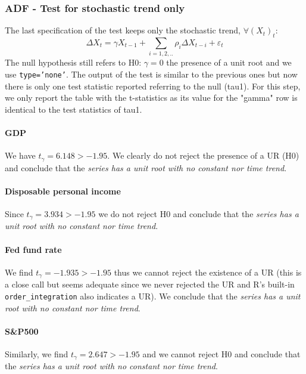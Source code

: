 \documentclass[hidelinks,12pts]{article}
\DeclareMathOperator{\1}{\mathbbm{1}}
\begin{document}
\subsubsection{ADF - Test for stochastic trend only}
The last specification of the test keeps only the stochastic trend, $\forall (X_t)_t$: 
    \begin{equation}
        \Delta X_t = \gamma X_{t-1} +\sum_{i=1,2,..}\rho_i \Delta X_{t-i} + \varepsilon_t
    \end{equation}
The null hypothesis still refers to H0: $\gamma =0$ the presence of a unit root and we use \texttt{type='none'}.
The output of the test is similar to the previous ones but now there is only one test statistic reported referring to the null (tau1).
For this step, we only report the table with the t-statistics as its value for the "gamma" row is identical to the test statistics of tau1.

%


\paragraph{GDP}
We have $t_\gamma = 6.148> -1.95$. We clearly do not reject the presence of a UR (H0) and conclude that the \emph{series has a unit root with no constant nor time trend}.

\paragraph{Disposable personal income}
Since $t_\gamma = 3.934> -1.95$ we do not reject H0 and conclude that the \emph{series has a unit root with no constant nor time trend}.

\paragraph{Fed fund rate}
We find $t_\gamma = -1.935> -1.95$ thus we cannot reject the existence of a UR (this is a close call but seems adequate since we never rejected the UR and R's built-in \texttt{order\_integration} also indicates a UR). 
We conclude that the \emph{series has a unit root with no constant nor time trend}.


\paragraph{S\&P500}
Similarly, we find $t_\gamma = 2.647> -1.95$ and we cannot reject H0 and conclude that the \emph{series has a unit root with no constant nor time trend}.
\end{document}
